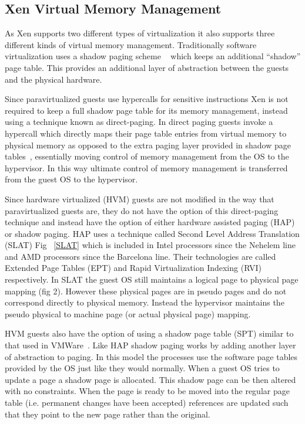 \subsection{Xen Virtual Memory Management}

As Xen supports two different types of virtualization it also supports three different kinds of virtual memory management. Traditionally software virtualization uses a shadow paging scheme ~\cite{barham_xen_2003} which keeps an additional ``shadow'' page table. This provides an additional layer of abstraction between the guests and the physical hardware. 

Since paravirtualized guests use hypercalls for sensitive instructions Xen is not required to keep a full shadow page table for its memory management, instead using a technique known as direct-paging. In direct paging guests invoke a hypercall which directly maps their page table entries from virtual memory to physical memory as opposed to the extra paging layer provided in shadow page tables~\cite{barham_xen_2003},  essentially moving control of memory management from the OS to the hypervisor. In this way ultimate control of memory management is transferred from the guest OS to the hypervisor. 


Since hardware virtualized (HVM) guests are not modified in the way that paravirtualized guests are, they do not have the option of this direct-paging technique and instead have the option of either hardware assisted paging (HAP) or shadow paging. HAP uses a technique called Second Level Address Translation (SLAT) Fig ~\ref{SLAT} which is included in Intel processors since the Nehelem line and AMD processors since the Barcelona line. Their technologies are called Extended Page Tables (EPT) and Rapid Virtualization Indexing (RVI) respectively. In SLAT the guest OS still maintains a logical page to physical page mapping (fig 2). However these physical pages are in pseudo pages and do not correspond directly to physical memory. Instead the hypervisor maintains the pseudo physical to machine page (or actual physical page) mapping.  


HVM guests also have the option of using a shadow page table (SPT) similar to that used in VMWare~\cite{rosenblum_vmwareas_1999}.  Like HAP shadow paging works by adding another layer of abstraction to paging. In this model the processes use the software page tables provided by the OS just like they would normally. When a guest OS tries to update a page a shadow page is allocated. This shadow page can be then altered with no constraints. When the page is ready to be moved into the regular page table (i.e. permanent changes have been accepted) references are updated such that they point to the new page rather than the original.

